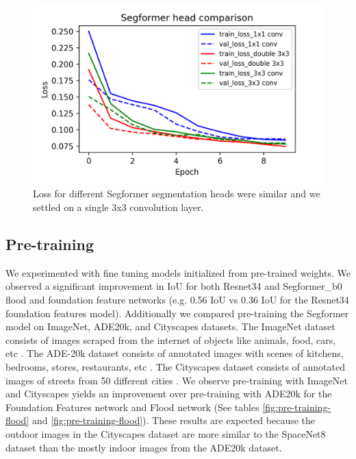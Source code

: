\documentclass[10pt,twocolumn,letterpaper]{article}
\begin{document}
\begin{figure}[t]
  \centering
   \includegraphics[width=1\linewidth]{figures/segformer_head_comparison.png}
   \caption{Loss for different Segformer segmentation heads were similar and we settled on a single 3x3 convolution layer.}
   \label{fig:segformer_head}
\end{figure}

\subsection{Pre-training}

We experimented with fine tuning models initialized from pre-trained weights. We observed a significant improvement in IoU for both Resnet34 and Segformer\_b0 flood and foundation feature networks (e.g. 0.56 IoU vs 0.36 IoU for the Resnet34 foundation features model). Additionally we compared pre-training the Segformer model on ImageNet, ADE20k, and Cityscapes datasets. The ImageNet dataset consists of images scraped from the internet of objects like animals, food, cars, etc \cite{ILSVRC15}. The ADE-20k dataset consists of annotated images with scenes of kitchens, bedrooms, stores, restaurants, etc \cite{zhou2017scene}. The Cityscapes dataset consists of annotated images of streets from 50 different cities \cite{cordts2016cityscapes}. We observe pre-training with ImageNet and Cityscapes yields an improvement over pre-training with ADE20k for the Foundation Features network and Flood network (See tables \ref{fig:pre-training-flood} and \ref{fig:pre-training-flood}). These results are expected because the outdoor images in the Cityscapes dataset are more similar to the SpaceNet8 dataset than the mostly indoor images from the ADE20k dataset.
\end{document}
